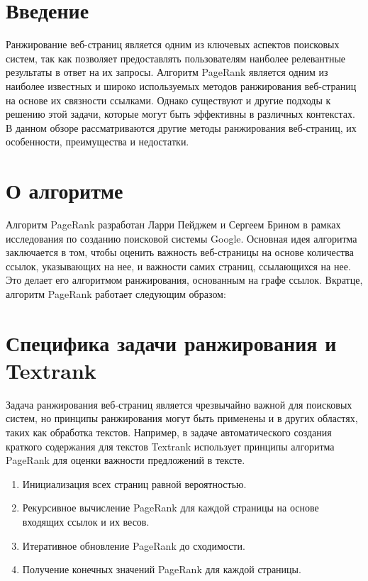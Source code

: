 \documentclass[a4paper]{article}
\begin{document}
	\thispagestyle{empty}
	
	
		
	\newpage
		
	\tableofcontents
	
	\pagestyle{plain}
	
	\newpage
	
	\section{Введение}
	
	Ранжирование веб-страниц является одним из ключевых аспектов поисковых систем, так как позволяет предоставлять пользователям наиболее релевантные результаты в ответ на их запросы. Алгоритм PageRank является одним из наиболее известных и широко используемых методов ранжирования веб-страниц на основе их связности ссылками. Однако существуют и другие подходы к решению этой задачи, которые могут быть эффективны в различных контекстах. В данном обзоре рассматриваются другие методы ранжирования веб-страниц, их особенности, преимущества и недостатки.
	
	\section{О алгоритме}
	Алгоритм PageRank разработан Ларри Пейджем и Сергеем Брином в рамках исследования по созданию поисковой системы Google. Основная идея алгоритма заключается в том, чтобы оценить важность веб-страницы на основе количества ссылок, указывающих на нее, и важности самих страниц, ссылающихся на нее. Это делает его алгоритмом ранжирования, основанным на графе ссылок. Вкратце, алгоритм PageRank работает следующим образом:
	
	\section{Специфика задачи ранжирования и Textrank}
	
	Задача ранжирования веб-страниц является чрезвычайно важной для поисковых систем, но принципы ранжирования могут быть применены и в других областях, таких как обработка текстов. Например, в задаче автоматического создания краткого содержания для текстов Textrank использует принципы алгоритма PageRank для оценки важности предложений в тексте.
	
	\begin{enumerate}
		\item Инициализация всех страниц равной вероятностью.
		\item Рекурсивное вычисление PageRank для каждой страницы на основе входящих ссылок и их весов.
		\item Итеративное обновление PageRank до сходимости.
		\item Получение конечных значений PageRank для каждой страницы.
	\end{enumerate}
\end{document}

